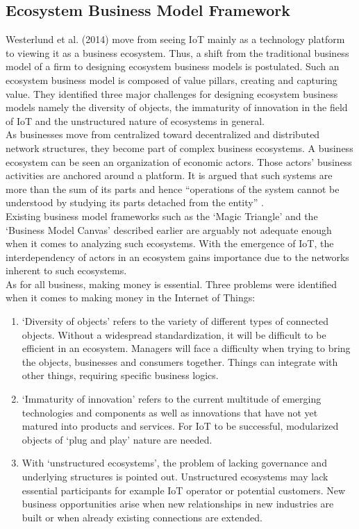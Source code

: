 	\subsection{Ecosystem Business Model Framework}
	\vspace{-1em}
		Westerlund et al. (2014) \cite{westerlund} move from seeing IoT mainly as a technology platform to viewing it as a business ecosystem. Thus, a shift from the traditional business model of a firm to designing ecosystem business models is postulated. Such an ecosystem business model is composed of value pillars, creating and capturing value. They identified three major challenges for designing ecosystem business models namely the diversity of objects, the immaturity of innovation in the field of IoT and the unstructured nature of ecosystems in general.\\
		As businesses move from centralized toward decentralized and distributed network structures, they become part of complex business ecosystems. A business ecosystem can be seen an organization of economic actors. Those actors' business activities are anchored around a platform. It is argued that such systems are more than the sum of its parts and hence ``operations of the system cannot be understood by studying its parts detached from the entity'' \cite{westerlund}.\\
		Existing business model frameworks such as the `Magic Triangle' and the `Business Model Canvas' described earlier are arguably not adequate enough when it comes to analyzing such ecosystems. With the emergence of IoT, the interdependency of actors in an ecosystem gains importance due to the networks inherent to such ecosystems.\\
		As for all business, making money is essential. Three problems were identified  when it comes to making money in the Internet of Things:\\
		\vspace{-1em}
		\begin{enumerate}
			\item `Diversity of objects' refers to the variety of different types of connected objects. Without a widespread standardization, it will be difficult to be efficient in an ecosystem. Managers will face a difficulty when trying to bring the objects, businesses and consumers together. Things can integrate with other things, requiring specific business logics.

			\item `Immaturity of innovation' refers to the current multitude of emerging technologies and components as well as innovations that have not yet matured into products and services. For IoT to be successful, modularized objects of `plug and play' nature are needed.

			\item With `unstructured ecosystems', the problem of lacking governance and underlying structures is pointed out. Unstructured ecosystems may lack essential participants for example IoT operator or potential customers. New business opportunities arise when new relationships in new industries are built or when already existing connections are extended.
		\end{enumerate}
